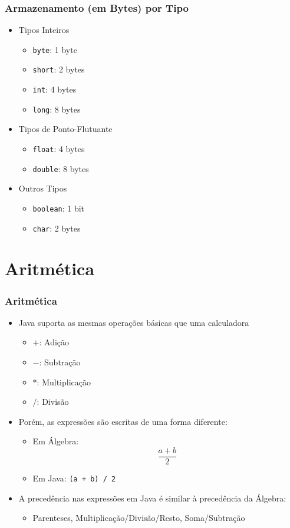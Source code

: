 \documentclass[xcolor={dvipsnames,table},aspectratio=169]{beamer}
\begin{document}
\begin{frame}\frametitle{Armazenamento (em Bytes) por Tipo}
\begin{itemize}
	\item Tipos Inteiros
	\begin{itemize}
		\item \texttt{byte}: 1 byte
		\item \texttt{short}: 2 bytes
		\item \texttt{int}: 4 bytes
		\item \texttt{long}: 8 bytes
	\end{itemize}
	\item Tipos de Ponto-Flutuante
	\begin{itemize}
		\item \texttt{float}: 4 bytes
		\item \texttt{double}: 8 bytes
	\end{itemize}
	\item Outros Tipos
	\begin{itemize}
		\item \texttt{boolean}: 1 bit
		\item \texttt{char}: 2 bytes
	\end{itemize}
\end{itemize}
\end{frame}

\section{Aritmética}

\begin{frame}\frametitle{Aritmética}
\begin{itemize}
	\item Java suporta as mesmas operações básicas que uma calculadora
	\begin{itemize}
		\item $+$: Adição
		\item $-$: Subtração
		\item $*$: Multiplicação
		\item $/$: Divisão
	\end{itemize}
	\item Porém, as expressões são escritas de uma forma diferente:
	\begin{itemize}
		\item Em Álgebra: \[\frac{a+b}{2}\]
		\item Em Java: \texttt{(a + b) / 2}
	\end{itemize}
	\item A precedência nas expressões em Java é similar à precedência da Álgebra:
	\begin{itemize}
		\item Parenteses, Multiplicação/Divisão/Resto, Soma/Subtração
	\end{itemize}
\end{itemize}
\end{frame}
\end{document}
